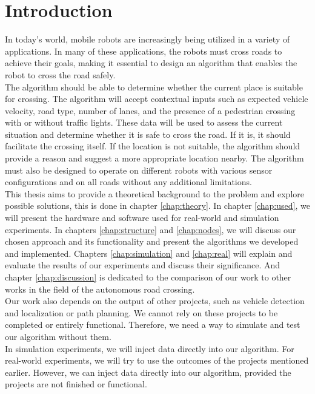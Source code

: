 \chapter*{Introduction}
    In today's world, mobile robots are increasingly being utilized in a variety of applications. In many of these applications, the robots must cross roads to achieve their goals, making it essential to design an algorithm that enables the robot to cross the road safely.\\
    The algorithm should be able to determine whether the current place is suitable for crossing. The algorithm will accept contextual inputs such as expected vehicle velocity, road type, number of lanes, and the presence of a pedestrian crossing with or without traffic lights. These data will be used to assess the current situation and determine whether it is safe to cross the road. If it is, it should facilitate the crossing itself. If the location is not suitable, the algorithm should provide a reason and suggest a more appropriate location nearby. The algorithm must also be designed to operate on different robots with various sensor configurations and on all roads without any additional limitations.\\
    This thesis aims to provide a theoretical background to the problem and explore possible solutions, this is done in chapter \ref{chap:theory}. In chapter \ref{chap:used}, we will present the hardware and software used for real-world and simulation experiments. In chapters \ref{chap:structure} and \ref{chap:nodes}, we will discuss our chosen approach and its functionality and present the algorithms we developed and implemented. Chapters \ref{chap:simulation} and \ref{chap:real} will explain and evaluate the results of our experiments and discuss their significance. And chapter \ref{chap:discussion} is dedicated to the comparison of our work to other works in the field of the autonomous road crossing.\\
    Our work also depends on the output of other projects, such as vehicle detection and localization or path planning. We cannot rely on these projects to be completed or entirely functional. Therefore, we need a way to simulate and test our algorithm without them.\\
    In simulation experiments, we will inject data directly into our algorithm. For real-world experiments, we will try to use the outcomes of the projects mentioned earlier. However, we can inject data directly into our algorithm, provided the projects are not finished or functional.\\
    \newpage
